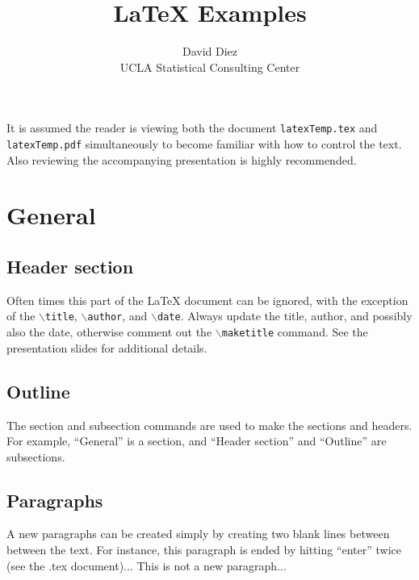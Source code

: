 \documentclass[11pt]{article} %
\title{LaTeX Examples}
\author{David Diez \\
UCLA Statistical Consulting Center}
\date{}  %
\begin{document}
\maketitle %
\tableofcontents %
\pagebreak

It is assumed the reader is viewing both the document \texttt{latexTemp.tex} and \texttt{latexTemp.pdf} simultaneously to become familiar with how to control the text. Also reviewing the accompanying presentation is highly recommended.

\section{General}

\subsection{Header section}



Often times this part of the LaTeX document can be ignored, with the exception of the \texttt{$\backslash$title}, \texttt{$\backslash$author}, and \texttt{$\backslash$date}. Always update the title, author, and possibly also the date, otherwise comment out the \texttt{$\backslash$maketitle} command. See the presentation slides for additional details.

\subsection{Outline}
The section and subsection commands are used to make the sections and headers. For example, ``General'' is a section, and ``Header section'' and ``Outline'' are subsections.

\subsection{Paragraphs}

A new paragraphs can be created simply by creating two blank lines between between the text. For instance, this paragraph is ended by hitting ``enter'' twice (see the .tex document)...
This is not a new paragraph...
\end{document}
